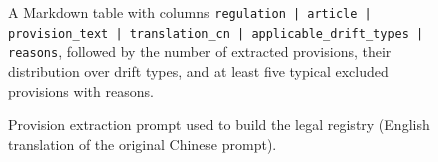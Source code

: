 \begin{figure}[p]
\begin{tcolorbox}[
    enhanced,
    colback=gray!5,
    colframe=black!60,
    arc=2pt,
    boxrule=0.5pt,
    width=\linewidth,
    left=6pt, right=6pt, top=0pt, bottom=10pt,
    parbox=false,
]
\begin{minipage}[t]{0.477\linewidth}
\vspace{2pt}
A Markdown table with columns \texttt{regulation | article | provision\_text | translation\_cn | applicable\_drift\_types | reasons}, followed by the number of extracted provisions, their distribution over drift types, and at least five typical excluded provisions with reasons.

\end{minipage}
\end{tcolorbox}
\caption{Provision extraction prompt used to build the legal registry (English translation of the original Chinese prompt).}
\label{fig:legal-extraction-prompt}
\end{figure}
